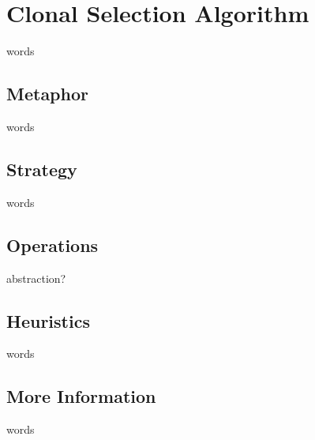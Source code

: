 %
%


%
%
\section{Clonal Selection Algorithm}
words


%
%
\subsection{Metaphor}
words

%
%
\subsection{Strategy}
words


%
%
\subsection{Operations}
abstraction?


%
%
\subsection{Heuristics}
words

%
%
\subsection{More Information}
words


